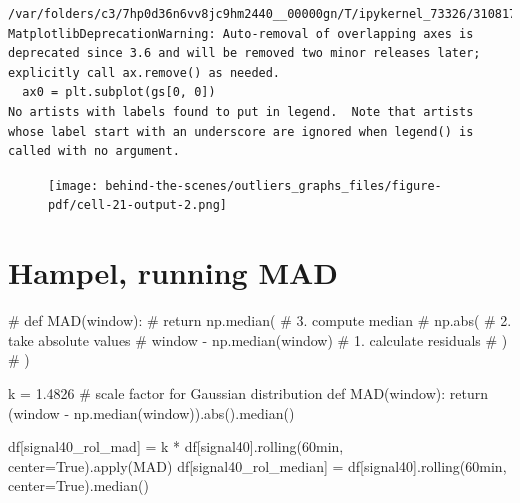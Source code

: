 \documentclass[
  letterpaper,
  DIV=11,
  numbers=noendperiod,
  oneside]{scrreprt}
\newenvironment{Shaded}{\begin{snugshade}}{\end{snugshade}}
\newcommand{\BuiltInTok}[1]{\textcolor[rgb]{0.00,0.23,0.31}{#1}}
\newcommand{\CommentTok}[1]{\textcolor[rgb]{0.37,0.37,0.37}{#1}}
\newcommand{\ControlFlowTok}[1]{\textcolor[rgb]{0.00,0.23,0.31}{#1}}
\newcommand{\FloatTok}[1]{\textcolor[rgb]{0.68,0.00,0.00}{#1}}
\newcommand{\KeywordTok}[1]{\textcolor[rgb]{0.00,0.23,0.31}{#1}}
\newcommand{\NormalTok}[1]{\textcolor[rgb]{0.00,0.23,0.31}{#1}}
\newcommand{\OperatorTok}[1]{\textcolor[rgb]{0.37,0.37,0.37}{#1}}
\newcommand{\StringTok}[1]{\textcolor[rgb]{0.13,0.47,0.30}{#1}}
\newcommand{\VariableTok}[1]{\textcolor[rgb]{0.07,0.07,0.07}{#1}}
\begin{document}
\begin{verbatim}
/var/folders/c3/7hp0d36n6vv8jc9hm2440__00000gn/T/ipykernel_73326/3108172465.py:6: MatplotlibDeprecationWarning: Auto-removal of overlapping axes is deprecated since 3.6 and will be removed two minor releases later; explicitly call ax.remove() as needed.
  ax0 = plt.subplot(gs[0, 0])
No artists with labels found to put in legend.  Note that artists whose label start with an underscore are ignored when legend() is called with no argument.
\end{verbatim}

\begin{figure}[H]

{\centering \texttt{[image: behind-the-scenes/outliers\_graphs\_files/figure-pdf/cell-21-output-2.png]}

}

\end{figure}

\hypertarget{hampel-running-mad}{%
\section{Hampel, running MAD}\label{hampel-running-mad}}

\begin{Shaded}
\begin{Highlighting}[]
\CommentTok{\# def MAD(window):}
\CommentTok{\#     return np.median(                                \# 3. compute median}
\CommentTok{\#                      np.abs(                         \# 2. take absolute values}
\CommentTok{\#                          window {-} np.median(window)  \# 1. calculate residuals}
\CommentTok{\#                          )}
\CommentTok{\#                     )}

\NormalTok{k }\OperatorTok{=} \FloatTok{1.4826} \CommentTok{\# scale factor for Gaussian distribution}
\KeywordTok{def}\NormalTok{ MAD(window):}
    \ControlFlowTok{return}\NormalTok{ (window }\OperatorTok{{-}}\NormalTok{ np.median(window)).}\BuiltInTok{abs}\NormalTok{().median()}
\end{Highlighting}
\end{Shaded}

\begin{Shaded}
\begin{Highlighting}[]
\NormalTok{df[}\StringTok{\textquotesingle{}signal40\_rol\_mad\textquotesingle{}}\NormalTok{] }\OperatorTok{=}\NormalTok{ k }\OperatorTok{*}\NormalTok{ df[}\StringTok{\textquotesingle{}signal40\textquotesingle{}}\NormalTok{].rolling(}\StringTok{\textquotesingle{}60min\textquotesingle{}}\NormalTok{, center}\OperatorTok{=}\VariableTok{True}\NormalTok{).}\BuiltInTok{apply}\NormalTok{(MAD)}
\NormalTok{df[}\StringTok{\textquotesingle{}signal40\_rol\_median\textquotesingle{}}\NormalTok{] }\OperatorTok{=}\NormalTok{ df[}\StringTok{\textquotesingle{}signal40\textquotesingle{}}\NormalTok{].rolling(}\StringTok{\textquotesingle{}60min\textquotesingle{}}\NormalTok{, center}\OperatorTok{=}\VariableTok{True}\NormalTok{).median()}
\end{Highlighting}
\end{Shaded}
\end{document}
